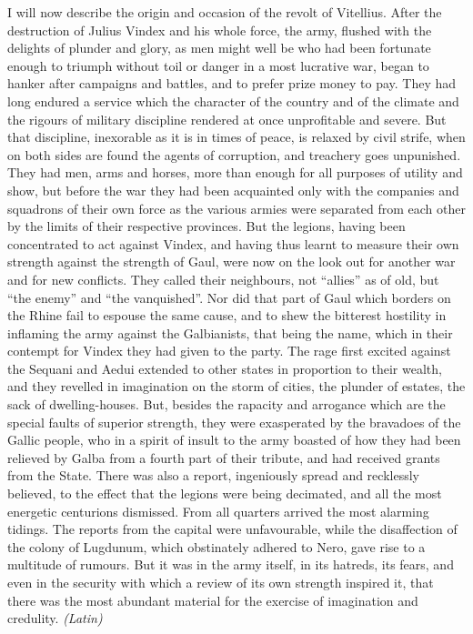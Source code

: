 I will now describe the origin and occasion of the revolt of Vitellius. After the destruction of Julius Vindex and his whole force, the army, flushed with the delights of plunder and glory, as men might well be who had been fortunate enough to triumph without toil or danger in a most lucrative war, began to hanker after campaigns and battles, and to prefer prize money to pay. They had long endured a service which the character of the country and of the climate and the rigours of military discipline rendered at once unprofitable and severe. But that discipline, inexorable as it is in times of peace, is relaxed by civil strife, when on both sides are found the agents of corruption, and treachery goes unpunished. They had men, arms and horses, more than enough for all purposes of utility and show, but before the war they had been acquainted only with the companies and squadrons of their own force as the various armies were separated from each other by the limits of their respective provinces. But the legions, having been concentrated to act against Vindex, and having thus learnt to measure their own strength against the strength of Gaul, were now on the look out for another war and for new conflicts. They called their neighbours, not ``allies'' as of old, but ``the enemy'' and ``the vanquished''. Nor did that part of Gaul which borders on the Rhine fail to espouse the same cause, and to shew the bitterest hostility in inflaming the army against the Galbianists, that being the name, which in their contempt for Vindex they had given to the party. The rage first excited against the Sequani and Aedui extended to other states in proportion to their wealth, and they revelled in imagination on the storm of cities, the plunder of estates, the sack of dwelling-houses. But, besides the rapacity and arrogance which are the special faults of superior strength, they were exasperated by the bravadoes of the Gallic people, who in a spirit of insult to the army boasted of how they had been relieved by Galba from a fourth part of their tribute, and had received grants from the State. There was also a report, ingeniously spread and recklessly believed, to the effect that the legions were being decimated, and all the most energetic centurions dismissed. From all quarters arrived the most alarming tidings. The reports from the capital were unfavourable, while the disaffection of the colony of Lugdunum, which obstinately adhered to Nero, gave rise to a multitude of rumours. But it was in the army itself, in its hatreds, its fears, and even in the security with which a review of its own strength inspired it, that there was the most abundant material for the exercise of imagination and credulity. \emph{(Latin)}

